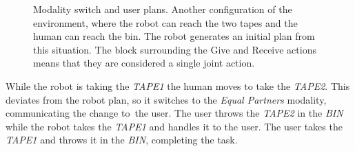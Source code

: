 \begin{itemize}
\begin{figure}
  \centering
  \caption[Robot coworker experiment 2]{Modality switch and user plans. Another configuration of
    the environment, where the robot can reach the two tapes and the
    human can reach the bin. The robot generates an initial plan
  from this situation. The block surrounding the Give and Receive
  actions means that they are considered a single joint action.}
  \centering
  \label{fig:coworker_results_scenario2}
\end{figure}

While the robot is taking the \textit{TAPE1} the human moves
to take the \textit{TAPE2}. This deviates from the robot plan, so it
switches to the \textit{Equal Partners} modality, communicating the change to\
the user. The user throws the \textit{TAPE2} in the \textit{BIN} while
the robot takes the \textit{TAPE1} and handles it to the user. The user
takes the \textit{TAPE1} and throws it in the \textit{BIN}, completing the task.


\end{itemize}
